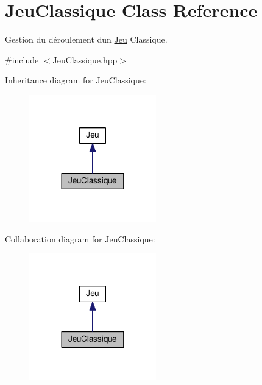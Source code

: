\hypertarget{classJeuClassique}{}\section{Jeu\+Classique Class Reference}
\label{classJeuClassique}


Gestion du déroulement d\textquotesingle{}un \hyperlink{classJeu}{Jeu} Classique.  




{\ttfamily \#include $<$Jeu\+Classique.\+hpp$>$}



Inheritance diagram for Jeu\+Classique\+:
\nopagebreak
\begin{figure}[H]
\begin{center}
\leavevmode
\includegraphics[width=156pt]{classJeuClassique__inherit__graph}
\end{center}
\end{figure}


Collaboration diagram for Jeu\+Classique\+:
\nopagebreak
\begin{figure}[H]
\begin{center}
\leavevmode
\includegraphics[width=156pt]{classJeuClassique__coll__graph}
\end{center}
\end{figure}
